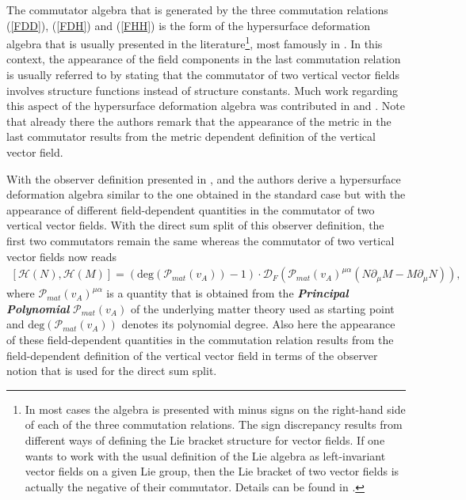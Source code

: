 \documentclass[a4paper,12pt, DIV=14, BCOR=5mm, twoside, headsepline, numbers=noenddot]{scrbook}
\begin{document}
The commutator algebra that is generated by the three commutation relations (\ref{FDD}), (\ref{FDH}) and (\ref{FHH}) is the form of the hypersurface deformation algebra that is usually presented in the literature\footnote{In most cases the algebra is presented with minus signs on the right-hand side of each of the three commutation relations. The sign discrepancy results from different ways of defining the Lie bracket structure for vector fields. If one wants to work with the usual definition of the Lie algebra as left-invariant vector fields on a given Lie group, then the Lie bracket of two vector fields is actually the negative of their commutator. Details can be found in \cite{1985AnPhy.164..288I}.}, most famously in \cite{HOJMAN197688}. In this context, the appearance of the field components in the last commutation relation is usually referred to by stating that the commutator of two vertical vector fields involves structure functions instead of structure constants. Much work regarding this aspect of the hypersurface deformation algebra was contributed in \cite{1985AnPhy.164..288I} and \cite{1985AnPhy.164..316I}. Note that already there the authors remark that the appearance of the metric in the last commutator results from the metric dependent definition of the vertical vector field. 

With the observer definition presented in \cite{2018PhRvD..97h4036D}, \cite{2011PhRvD..83d4047R} and \cite{Rivera} the authors derive a hypersurface deformation algebra similar to the one obtained in the standard case but with the appearance of different field-dependent quantities in the commutator of two vertical vector fields. With the direct sum split of this observer definition, the first two commutators remain the same whereas the commutator of two vertical vector fields now reads
\begin{align}
    \left[\mathcal{H}(N), \mathcal{H}(M) \right] = \left(\mathrm{deg}(\mathcal{P}_{mat}(v_A)) -1\right ) \cdot  \mathcal{D}_F\left(\mathcal{P}_{mat}(v_A)^{\mu \alpha}( N\partial_{\mu} M - M \partial_{\mu}N  ) \right),
\end{align}
where $\mathcal{P}_{mat}(v_A)^{\mu \alpha}$ is a quantity that is obtained from the \textit{\textbf{Principal Polynomial}} $\mathcal{P}_{mat}(v_A)$ of the underlying matter theory used as starting point and $\mathrm{deg}(\mathcal{P}_{mat}(v_A))$ denotes its polynomial degree. Also here the appearance of these field-dependent quantities in the commutation relation results from the field-dependent definition of the vertical vector field in terms of the observer notion that is used for the direct sum split.
\end{document}
